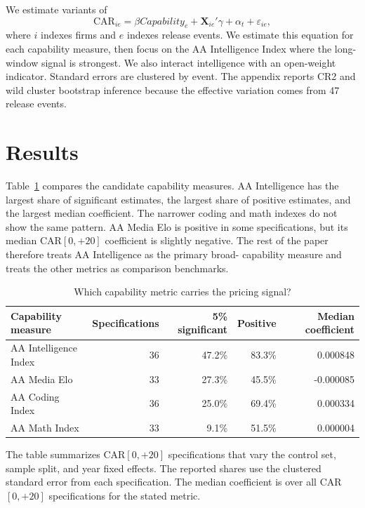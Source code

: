 \documentclass[12pt]{article}
\begin{document}
We estimate variants of
\begin{equation}
\label{eq:main}
\text{CAR}_{ie} = \beta \textit{Capability}_{e} +
\mathbf{X}_{ie}'\gamma + \alpha_t + \varepsilon_{ie},
\end{equation}
where $i$ indexes firms and $e$ indexes release events. We estimate this
equation for each capability measure, then focus on the AA Intelligence Index
where the long-window signal is strongest. We also interact intelligence with an
open-weight indicator. Standard errors are clustered by event. The appendix
reports CR2 and wild cluster bootstrap inference because the effective variation
comes from 47 release events.

\section{Results}
\label{sec:results}

Table~\ref{tab:metrics} compares the candidate capability measures. AA
Intelligence has the largest share of significant estimates, the largest share
of positive estimates, and the largest median coefficient. The narrower coding
and math indexes do not show the same pattern. AA Media Elo is positive in some
specifications, but its median CAR$[0,{+}20]$ coefficient is slightly negative.
The rest of the paper therefore treats AA Intelligence as the primary broad-
capability measure and treats the other metrics as comparison benchmarks.

\begin{table}[htbp]
\centering
\caption{Which capability metric carries the pricing signal?}
\label{tab:metrics}
\begin{threeparttable}
\begin{tabular}{lrrrr}
\toprule
Capability measure & Specifications & 5\% significant & Positive & Median coefficient \\
\midrule
AA Intelligence Index & 36 & 47.2\% & 83.3\% & 0.000848 \\
AA Media Elo & 33 & 27.3\% & 45.5\% & -0.000085 \\
AA Coding Index & 36 & 25.0\% & 69.4\% & 0.000334 \\
AA Math Index & 33 & 9.1\% & 51.5\% & 0.000004 \\
\bottomrule
\end{tabular}
\begin{tablenotes}[flushleft]\footnotesize
\item The table summarizes CAR$[0,{+}20]$ specifications that vary the control
set, sample split, and year fixed effects. The reported shares use the clustered
standard error from each specification. The median coefficient is over all
CAR$[0,{+}20]$ specifications for the stated metric.
\end{tablenotes}
\end{threeparttable}
\end{table}
\end{document}
